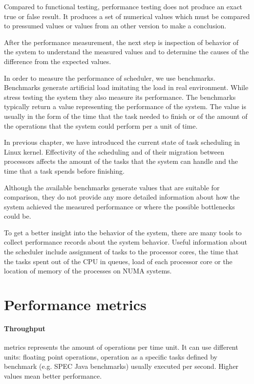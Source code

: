 Compared to functional testing, performance testing does not produce an exact true
or false result. It produces a set of numerical values which must be compared to
pressumed values or values from an other version to make a conclusion.

After the performance measurement, the next step is inspection of behavior of
the system to understand the measured values and to determine the causes of the
difference from the expected values.

In order to measure the performance of scheduler, we use benchmarks.
Benchmarks generate artificial load imitating the load in real environment.
While stress testing the system they also measure its performance. The benchmarks
typically return a value representing the performance of the system. The value
is usually in the form of the time that the task needed to finish or of the amount of
the operations that the system could perform per a unit of time.

In previous chapter, we have introduced the current state of task scheduling in
Linux kernel.
Effectivity of the scheduling and of their migration between processors affects
the amount of the tasks that the system can handle and the time that a task
spends before finishing.

Although the available benchmarks generate values that are suitable for comparison, they
do not provide any more detailed information about how the system achieved the
measured performance or where the possible bottlenecks could be.

To get a better insight into the behavior of the system, there are many tools to
collect performance records about the system behavior. Useful information about the
scheduler include assignment of tasks to the processor cores, the time that the
tasks spent out of the CPU in queues, load of each processor core or the
location of memory of the processes on NUMA systems.

\section{Performance metrics} \label{sec:metrics}
\paragraph{Throughput} metrics represents the amount of operations per time
unit. It can use different units: floating point operations, operation as
a specific tasks defined by benchmark (e.g. SPEC Java benchmarks) usually
executed per second. Higher values mean better performance.


